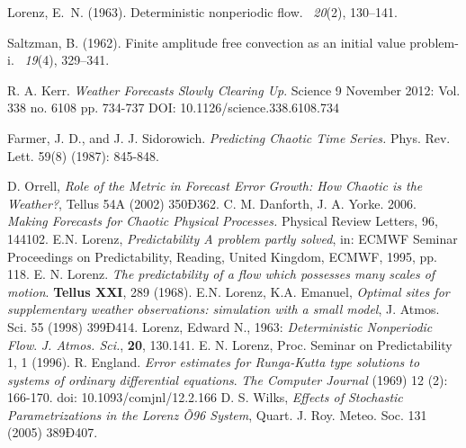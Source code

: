 \documentclass[onecolumn]{article}
\begin{document}
\begin{multicols}{2}
\begin{thebibliography}{9}
        Lorenz, E.~N. (1963).
        \newblock Deterministic nonperiodic flow.
        ~{\em 20\/}(2), 130--141.

        Saltzman, B. (1962).
        \newblock Finite amplitude free convection as an initial value problem-i.
        ~{\em 19\/}(4), 329--341.

	R. A. Kerr. \emph{Weather Forecasts Slowly Clearing Up}. Science 9 November 2012: Vol. 338 no. 6108 pp. 734-737 DOI: 10.1126/science.338.6108.734

                Farmer, J. D., and J. J. Sidorowich. \emph{Predicting Chaotic Time Series.} Phys. Rev. Lett. 59(8) (1987): 845-848.

	 D. Orrell, \emph{Role of the Metric in Forecast Error Growth: How Chaotic is
the Weather?}, Tellus 54A (2002) 350Ð362.
        	C. M. Danforth, J. A. Yorke.  2006. \emph{Making Forecasts for Chaotic Physical Processes.}
		Physical Review Letters, 96, 144102.
	E.N. Lorenz, \emph{Predictability A problem partly solved}, in: ECMWF Seminar Proceedings on Predictability, Reading, United
Kingdom, ECMWF, 1995, pp. 118.
                E. N. Lorenz. \emph{The predictability of a flow which possesses many scales of motion}. {\bf Tellus XXI}, 289 (1968).
	E.N. Lorenz, K.A. Emanuel, \emph{Optimal sites for supplementary weather observations: simulation with a small model}, J. Atmos. Sci.
55 (1998) 399Ð414.
                Lorenz, Edward N., 1963: \emph{Deterministic Nonperiodic Flow}. {\it J. Atmos. Sci.}, {\bf 20}, 130.141.
                E. N. Lorenz, Proc. Seminar on Predictability 1, 1 (1996).
                R. England. \emph{Error estimates for Runga-Kutta type solutions to systems of ordinary differential equations}. {\it The Computer Journal} (1969) 12 (2): 166-170. doi: 10.1093/comjnl/12.2.166
         D. S. Wilks, \emph{Effects of Stochastic Parametrizations in the Lorenz Õ96 System}, Quart. J. Roy. Meteo. Soc. 131 (2005) 389Ð407.


\end{thebibliography}
\end{multicols}
\end{document}
